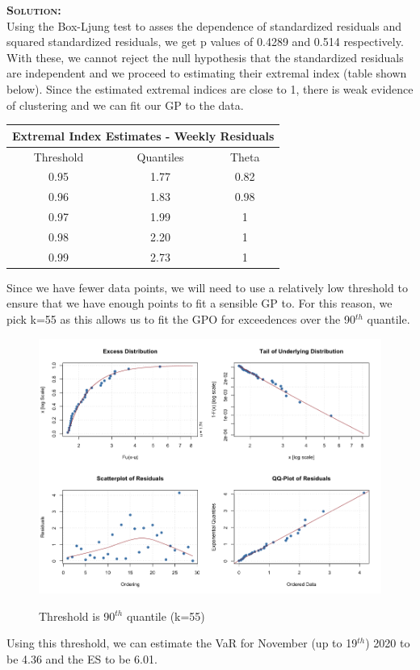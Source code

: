 \documentclass[12pt,oneside]{article}
\newenvironment{solution}
    {\textbf{\textsc{Solution:}}\\}
    {\newpage}
\begin{document}
\begin{solution}
Using the Box-Ljung test to asses the dependence of standardized residuals and squared standardized residuals, we get p values of 0.4289 and 0.514 respectively. With these, we cannot reject the null hypothesis that the standardized residuals are independent and we proceed to estimating their extremal index (table shown below). Since the estimated extremal indices are close to 1, there is weak evidence of clustering and we can fit our GP to the data.

\begin{center}
\begin{tabular}{ ||c |c |c|| }\hline
\multicolumn{3}{||c||}{Extremal Index Estimates - Weekly Residuals}\\\hline\hline
Threshold & Quantiles& Theta\\\hline
 0.95 & 1.77 & 0.82 \\ \hline
 0.96 & 1.83 & 0.98 \\  \hline
 0.97 & 1.99 & 1  \\\hline  
 0.98 & 2.20 & 1 \\ \hline
 0.99 & 2.73 & 1 \\  \hline
\end{tabular}
\end{center}
Since we have fewer data points, we will need to use a relatively low threshold to ensure that we have enough points to fit a sensible GP to. For this reason, we pick k=55 as this allows us to fit the GPO for exceedences over the 90$^{th}$ quantile.
\begin{figure}[H]
\begin{center}
{\includegraphics[width=4.5in]{Assignments/a4/55-gp-wk.png}}
\caption{Threshold is 90$^{th}$ quantile (k=55)}
\end{center}
\end{figure}
Using this threshold, we can estimate the VaR for November (up to 19$^{th}$) 2020 to be 4.36 and the ES to be 6.01.


\end{solution}
\end{document}
